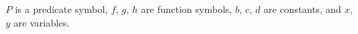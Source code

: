 $P$ is a predicate symbol, $f$, $g$, $h$ are function symbols, $b$, $c$, $d$ are constants, and $x$, $y$ are variables.
